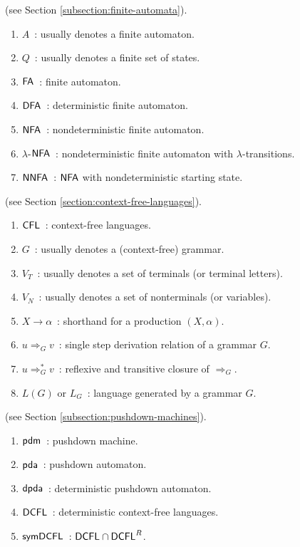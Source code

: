  (see Section \ref{subsection:finite-automata}).

\begin{enumerate}[]
\item $A$\ : usually denotes a finite automaton.
\item $Q$\ : usually denotes a finite set of states.
\item $\textup{\sf FA}$\ : finite automaton.
\item $\textup{\sf DFA}$\ : deterministic finite automaton.
\item $\textup{\sf NFA}$\ : nondeterministic finite automaton.
\item $\lambda$-$\textup{\sf NFA}$\ : nondeterministic finite automaton with $\lambda$-transitions.
\item $\textup{\sf NNFA}$\ : $\textup{\sf NFA}$ with nondeterministic starting state.
\end{enumerate}

 (see Section \ref{section:context-free-languages}).

\begin{enumerate}[]
\item $\textup{\sf CFL}$\ : context-free languages.
\item $G$\ : usually denotes a (context-free) grammar.
\item $V_T$\ : usually denotes a set of terminals (or terminal letters).
\item $V_N$\ : usually denotes a set of nonterminals (or variables).
\item $X \to \alpha$\ : shorthand for a production $(X, \alpha)$.
\item $u \Rightarrow_G v$\ : single step derivation relation of a grammar $G$.
\item $u \Rightarrow_G^* v$\ : reflexive and transitive closure of $\Rightarrow_G$.
\item $L(G)$ or $L_G$\ : language generated by a grammar $G$.
\end{enumerate}

 (see Section \ref{subsection:pushdown-machines}).

\begin{enumerate}[]
\item $\textup{\sf pdm}$\ : pushdown machine.
\item $\textup{\sf pda}$\ : pushdown automaton.
\item $\textup{\sf dpda}$\ : deterministic pushdown automaton.
\item $\textup{\sf DCFL}$\ : deterministic context-free languages.
\item $\textup{\sf symDCFL}$\ : $\textup{\sf DCFL}\cap\textup{\sf DCFL}^R$.
\end{enumerate}

